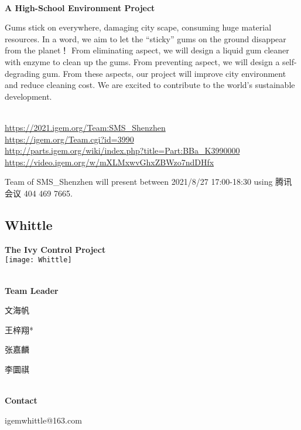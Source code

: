 \textbf{\\A High-School Environment Project\\}\begin{spacing}{1.5}

Gums stick on everywhere, damaging city scape, consuming huge material resources.
In a word, we aim to let the “sticky” gums on the ground disappear from the planet！
From eliminating aspect, we will design a liquid gum cleaner with  enzyme to clean up the gums.
From preventing aspect, we will design a self-degrading gum.
From these aspects, our project will improve city environment and reduce cleaning cost. We are excited to contribute to the world’s sustainable development.\end{spacing}
\\

\url{https://2021.igem.org/Team:SMS\_Shenzhen }\\
\url{https://igem.org/Team.cgi?id=3990 }\\
\url{http://parts.igem.org/wiki/index.php?title=Part:BBa_K3990000 }\\
\url{https://video.igem.org/w/mXLMxwvGhxZBWzo7ndDHfx }\\

\vfill{}









Team of SMS\_Shenzhen will present between   2021/8/27 17:00-18:30      using 腾讯会议 404 469 7665.
\newpage


\subsection{\textcolor{Blu}{ Whittle } }
\vspace{5mm}
\begin{center}
\large{
  \textbf{ The Ivy Control Project }\\

  \texttt{[image: Whittle]}
}
\end{center}
\textbf{\\Team Leader}

  文海帆

  王梓翔*

  张嘉麟

  李圜祺


\textbf{\\Contact}

  igemwhittle@163.com


